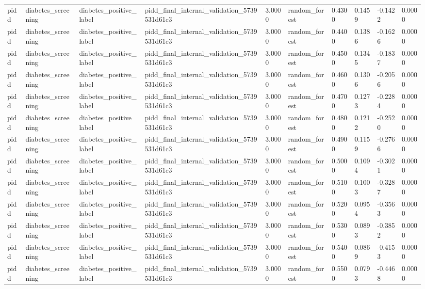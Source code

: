 \begin{tabular}{llllllllll}
pidd & diabetes\_screening & diabetes\_positive\_label & pidd\_final\_internal\_validation\_5739531d61c3 & 3.0000 & random\_forest & 0.4300 & 0.1459 & -0.1422 & 0.0000 \\
pidd & diabetes\_screening & diabetes\_positive\_label & pidd\_final\_internal\_validation\_5739531d61c3 & 3.0000 & random\_forest & 0.4400 & 0.1386 & -0.1626 & 0.0000 \\
pidd & diabetes\_screening & diabetes\_positive\_label & pidd\_final\_internal\_validation\_5739531d61c3 & 3.0000 & random\_forest & 0.4500 & 0.1345 & -0.1837 & 0.0000 \\
pidd & diabetes\_screening & diabetes\_positive\_label & pidd\_final\_internal\_validation\_5739531d61c3 & 3.0000 & random\_forest & 0.4600 & 0.1306 & -0.2056 & 0.0000 \\
pidd & diabetes\_screening & diabetes\_positive\_label & pidd\_final\_internal\_validation\_5739531d61c3 & 3.0000 & random\_forest & 0.4700 & 0.1273 & -0.2284 & 0.0000 \\
pidd & diabetes\_screening & diabetes\_positive\_label & pidd\_final\_internal\_validation\_5739531d61c3 & 3.0000 & random\_forest & 0.4800 & 0.1212 & -0.2520 & 0.0000 \\
pidd & diabetes\_screening & diabetes\_positive\_label & pidd\_final\_internal\_validation\_5739531d61c3 & 3.0000 & random\_forest & 0.4900 & 0.1159 & -0.2766 & 0.0000 \\
pidd & diabetes\_screening & diabetes\_positive\_label & pidd\_final\_internal\_validation\_5739531d61c3 & 3.0000 & random\_forest & 0.5000 & 0.1094 & -0.3021 & 0.0000 \\
pidd & diabetes\_screening & diabetes\_positive\_label & pidd\_final\_internal\_validation\_5739531d61c3 & 3.0000 & random\_forest & 0.5100 & 0.1003 & -0.3287 & 0.0000 \\
pidd & diabetes\_screening & diabetes\_positive\_label & pidd\_final\_internal\_validation\_5739531d61c3 & 3.0000 & random\_forest & 0.5200 & 0.0954 & -0.3563 & 0.0000 \\
pidd & diabetes\_screening & diabetes\_positive\_label & pidd\_final\_internal\_validation\_5739531d61c3 & 3.0000 & random\_forest & 0.5300 & 0.0893 & -0.3852 & 0.0000 \\
pidd & diabetes\_screening & diabetes\_positive\_label & pidd\_final\_internal\_validation\_5739531d61c3 & 3.0000 & random\_forest & 0.5400 & 0.0869 & -0.4153 & 0.0000 \\
pidd & diabetes\_screening & diabetes\_positive\_label & pidd\_final\_internal\_validation\_5739531d61c3 & 3.0000 & random\_forest & 0.5500 & 0.0793 & -0.4468 & 0.0000 \\

\end{tabular}
